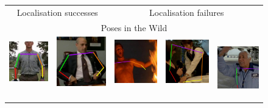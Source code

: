 \documentclass[runningheads]{llncs}
\begin{document}

\begin{figure}[t]
\begin{center}
\begin{tabular}{@{}c@{}c c@{}c@{}c@{}}
\multicolumn{2}{c}{Localisation successes} &
\multicolumn{3}{c}{Localisation failures}\\[0.4em]
\multicolumn{5}{c}{Poses in the Wild}\\
\includegraphics[width=0.17\linewidth]{figures/shots-cropped/piw-s18f30-good-gump-mower.jpg}\,&
\includegraphics[width=0.17\linewidth]{figures/shots-cropped/piw-s20f2-good-suit.jpg}\,&
\includegraphics[width=0.17\linewidth]{figures/shots-cropped/piw-s9f18-bad-no-wrist.jpg}\,&
\includegraphics[width=0.17\linewidth]{figures/shots-cropped/piw-s10f27-bad-pose-transfer.jpg}\,&
\includegraphics[width=0.17\linewidth]{figures/shots-cropped/piw-s13f15-bad-terminal-movement.jpg}\\

\end{tabular}
\end{center}
\end{figure}
\end{document}
